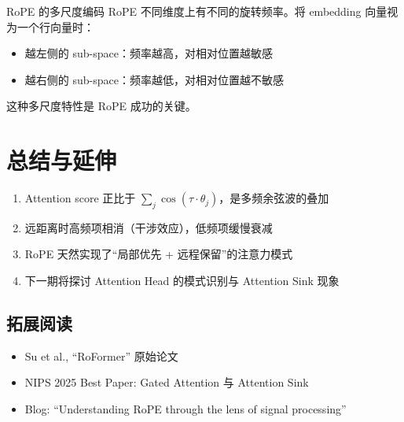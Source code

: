 \documentclass[a4paper]{article}
\begin{document}
\begin{knowledgebox}{RoPE 的多尺度编码}
RoPE 不同维度上有不同的旋转频率。将 embedding 向量视为一个行向量时：
\begin{itemize}
  \item 越左侧的 sub-space：频率越高，对相对位置越敏感
  \item 越右侧的 sub-space：频率越低，对相对位置越不敏感
\end{itemize}
这种多尺度特性是 RoPE 成功的关键。
\end{knowledgebox}

\section{总结与延伸}

\begin{enumerate}
  \item Attention score 正比于 $\sum_j \cos(\tau \cdot \theta_j)$，是多频余弦波的叠加
  \item 远距离时高频项相消（干涉效应），低频项缓慢衰减
  \item RoPE 天然实现了``局部优先 + 远程保留''的注意力模式
  \item 下一期将探讨 Attention Head 的模式识别与 Attention Sink 现象
\end{enumerate}

\subsection{拓展阅读}
\begin{itemize}
  \item Su et al., ``RoFormer'' 原始论文
  \item NIPS 2025 Best Paper: Gated Attention 与 Attention Sink
  \item Blog: ``Understanding RoPE through the lens of signal processing''
\end{itemize}
\end{document}
